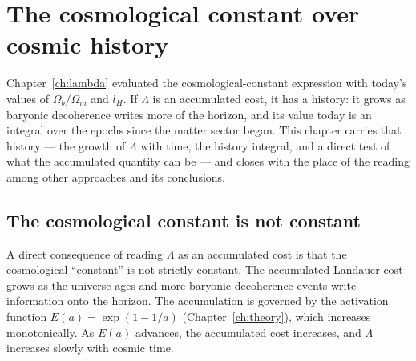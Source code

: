 \chapter{The cosmological constant over cosmic history}\label{ch:lambda_history}

Chapter~\ref{ch:lambda} evaluated the cosmological-constant expression with today's values of $\Omega_b/\Omega_m$ and $l_H$. If
$\Lambda$ is an accumulated cost, it has a history: it grows as baryonic decoherence writes more of the horizon, and its value today is
an integral over the epochs since the matter sector began. This chapter carries that history --- the growth of $\Lambda$ with time, the
history integral, and a direct test of what the accumulated quantity can be --- and closes with the place of the reading among other
approaches and its conclusions.

\section{The cosmological constant is not constant}\label{sec:lh_notconst}
A direct consequence of reading $\Lambda$ as an accumulated cost is that the cosmological ``constant'' is not strictly constant.
The accumulated Landauer cost grows as the universe ages and more baryonic decoherence events write information onto the horizon. The
accumulation is governed by the activation function $E(a)=\exp(1-1/a)$ (Chapter~\ref{ch:theory}), which increases monotonically. As
$E(a)$ advances, the accumulated cost increases, and $\Lambda$ increases slowly with cosmic time. \conjecture

